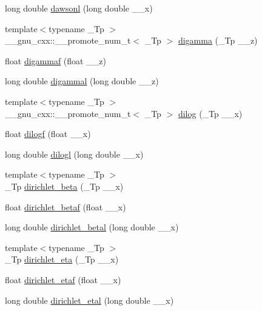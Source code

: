 \begin{DoxyCompactItemize}
long double \hyperlink{namespace____gnu__cxx_a6647a7444ff9c7c1f2a8ed36761bfeb2}{dawsonl} (long double \+\_\+\+\_\+x)
\item 
{\footnotesize template$<$typename \+\_\+\+Tp $>$ }\\\+\_\+\+\_\+gnu\+\_\+cxx\+::\+\_\+\+\_\+promote\+\_\+num\+\_\+t$<$ \+\_\+\+Tp $>$ \hyperlink{namespace____gnu__cxx_a6c698fd735df9d76905e2cad97f2316a}{digamma} (\+\_\+\+Tp \+\_\+\+\_\+z)
\item 
float \hyperlink{namespace____gnu__cxx_adb2a40ca78a0d909126734c75eabd86f}{digammaf} (float \+\_\+\+\_\+z)
\item 
long double \hyperlink{namespace____gnu__cxx_ae081ad08e1a42ffaad63b87b9f579dcf}{digammal} (long double \+\_\+\+\_\+z)
\item 
{\footnotesize template$<$typename \+\_\+\+Tp $>$ }\\\+\_\+\+\_\+gnu\+\_\+cxx\+::\+\_\+\+\_\+promote\+\_\+num\+\_\+t$<$ \+\_\+\+Tp $>$ \hyperlink{namespace____gnu__cxx_a8fceba3ecc618971e0e3c089d8dc49cf}{dilog} (\+\_\+\+Tp \+\_\+\+\_\+x)
\item 
float \hyperlink{namespace____gnu__cxx_a901091e0e7ce7d6113ae6a86f4865a92}{dilogf} (float \+\_\+\+\_\+x)
\item 
long double \hyperlink{namespace____gnu__cxx_ae90c13ee690ebaf10a18a900fe2646f9}{dilogl} (long double \+\_\+\+\_\+x)
\item 
{\footnotesize template$<$typename \+\_\+\+Tp $>$ }\\\+\_\+\+Tp \hyperlink{namespace____gnu__cxx_a87f600ab9980dea8c3d06c70adba58f3}{dirichlet\+\_\+beta} (\+\_\+\+Tp \+\_\+\+\_\+x)
\item 
float \hyperlink{namespace____gnu__cxx_a33e76ff6f8c24c530ad5941ce384d3dd}{dirichlet\+\_\+betaf} (float \+\_\+\+\_\+x)
\item 
long double \hyperlink{namespace____gnu__cxx_a210f1cc30defa00ceb6213054893df42}{dirichlet\+\_\+betal} (long double \+\_\+\+\_\+x)
\item 
{\footnotesize template$<$typename \+\_\+\+Tp $>$ }\\\+\_\+\+Tp \hyperlink{namespace____gnu__cxx_a31b1fde4c1d62963c478d3464adb3283}{dirichlet\+\_\+eta} (\+\_\+\+Tp \+\_\+\+\_\+x)
\item 
float \hyperlink{namespace____gnu__cxx_af4d7781d0d5e6071b2edd26b30d1c3f9}{dirichlet\+\_\+etaf} (float \+\_\+\+\_\+x)
\item 
long double \hyperlink{namespace____gnu__cxx_a1b7fa6ad635973504ef5caaa3fa4d44e}{dirichlet\+\_\+etal} (long double \+\_\+\+\_\+x)

\end{DoxyCompactItemize}
